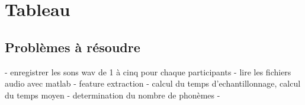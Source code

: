 
\chapter{Tableau} %

\label{Chapitre 2} %


\section{Problèmes à résoudre}

- enregistrer les sons wav de 1 à cinq pour chaque participants
- lire les fichiers audio avec matlab
- feature extraction
- calcul du temps d'echantillonnage, calcul du temps moyen
- determination du nombre de phonèmes
- 